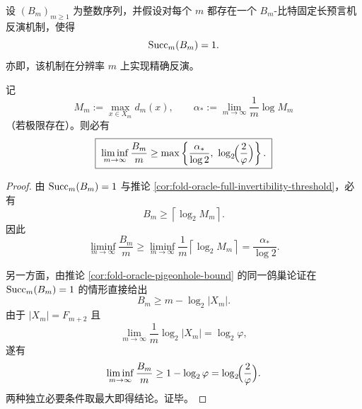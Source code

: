\begin{theorem}[固定长精确反演的渐近比特率下界]\label{thm:fold-oracle-exact-inversion-joint-rate-lower-bound}
设 \((B_m)_{m\ge 1}\) 为整数序列，并假设对每个 \(m\) 都存在一个 \(B_m\)-比特固定长预言机反演机制，使得
\[
{\rm Succ}_m(B_m)=1.
\]
亦即，该机制在分辨率 \(m\) 上实现精确反演。

记
\[
M_m:=\max_{x\in X_m}d_m(x),
\qquad
\alpha_*:=\lim_{m\to\infty}\frac{1}{m}\log M_m
\]
（若极限存在）。则必有
\[
\boxed{\;
\liminf_{m\to\infty}\frac{B_m}{m}
\ge
\max\left\{
\frac{\alpha_*}{\log 2},
\ \log_2\!\Bigl(\frac{2}{\varphi}\Bigr)
\right\}.\;}
\]
\end{theorem}
\begin{proof}
由 \({\rm Succ}_m(B_m)=1\) 与推论 \ref{cor:fold-oracle-full-invertibility-threshold}，必有
\[
B_m\ge \left\lceil\log_2 M_m\right\rceil.
\]
因此
\[
\liminf_{m\to\infty}\frac{B_m}{m}
\ge
\liminf_{m\to\infty}\frac{1}{m}\left\lceil\log_2 M_m\right\rceil
=
\frac{\alpha_*}{\log 2}.
\]

另一方面，由推论 \ref{cor:fold-oracle-pigeonhole-bound} 的同一鸽巢论证在 \({\rm Succ}_m(B_m)=1\) 的情形直接给出
\[
B_m\ge m-\log_2|X_m|.
\]
由于 \(|X_m|=F_{m+2}\) 且
\[
\lim_{m\to\infty}\frac{1}{m}\log_2|X_m|=\log_2\varphi,
\]
遂有
\[
\liminf_{m\to\infty}\frac{B_m}{m}\ge 1-\log_2\varphi=\log_2\!\Bigl(\frac{2}{\varphi}\Bigr).
\]
两种独立必要条件取最大即得结论。证毕。
\end{proof}

\endinput
